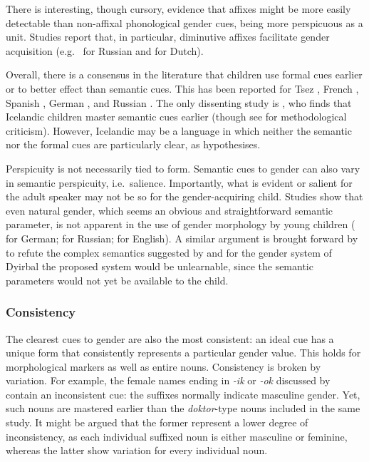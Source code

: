 \documentclass[output=collectionpaper]{langsci/langscibook}
\begin{document}
There is interesting, though cursory, evidence that affixes might be more easily detectable than non-affixal phonological gender cues, being more perspicuous as a unit. Studies report that, in particular, diminutive affixes facilitate gender acquisition (e.g.\ \citealt{Kempe2003} for Russian and \citealt{Cornips2008} for Dutch).

Overall, there is a consensus in the literature that children use formal cues earlier or to better effect than semantic cues. This has been reported for Tsez \citep{Gagliardi2014}, French \citep{Karmiloff-Smith1979}, Spanish \citep{PerezPereira1991}, German \citep{MacWhinney1978,Mills1986}, and Russian \citep{Rodina2014,Rodina2012}. The only dissenting study is \citet{Mulford1985}, who finds that Icelandic children master semantic cues earlier (though see \citealt{PerezPereira1991} for methodological criticism). However, Icelandic may be a language in which neither the semantic nor the formal cues are particularly clear, as \citet{Levy1988} hypothesises.

Perspicuity is not necessarily tied to form. Semantic cues to gender can also vary in semantic perspicuity, i.e.\ salience. Importantly, what is evident or salient for the adult speaker may not be so for the gender-acquiring child. Studies show that even natural gender, which seems an obvious and straightforward semantic parameter, is not apparent in the use of gender morphology by young children (\citealt{Szagun2007} for German; \citealt{Rodina2014} for Russian; \citealt{Mills1986} for English). A similar argument is brought forward by \citet{Plaster2010} to refute the complex semantics suggested by \citet{Dixon1972} and \citet{Lakoff1987} for the gender system of Dyirbal \textendash{} the proposed system would be unlearnable, since the semantic parameters would not yet be available to the child.

\subsubsection{Consistency}

The clearest cues to gender are also the most consistent: an ideal cue has a unique form that consistently represents a particular gender value. This holds for morphological markers as well as entire nouns. Consistency is broken by variation. For example, the female names ending in \textit{-ik} or \textit{-ok} discussed by \citet{Rodina2014} contain an inconsistent cue: the suffixes normally indicate masculine gender. Yet, such nouns are mastered earlier than the \textit{doktor}-type nouns included in the same study. It might be argued that the former represent a lower degree of inconsistency, as each individual suffixed noun is either masculine or feminine, whereas the latter show variation for every individual noun.
\end{document}

